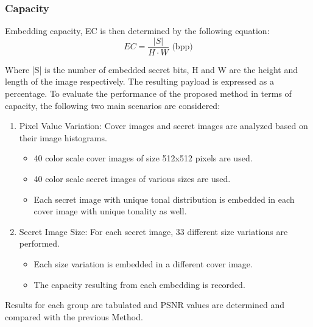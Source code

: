 \documentclass{ittelkom}
\begin{document}
\subsubsection{Capacity}

Embedding capacity, EC is then determined by the following equation:
\begin{equation}
    EC = \frac{|S|}{H \cdot W} \text{ (bpp)}
\end{equation}

Where |S| is the number of embedded secret bits, H and W are the height and
length of the image respectively. The resulting payload is expressed as a
percentage. To evaluate the performance of the proposed method in terms of
capacity, the following two main scenarios are considered:

\begin{enumerate}
    \item Pixel Value Variation: Cover images and secret images are analyzed based on
          their image histograms.
          \begin{itemize}
              \item 40 color scale cover images of size 512x512 pixels are used.
              \item 40 color scale secret images of various sizes are used.
              \item Each secret image with unique tonal distribution is embedded in each cover
                    image with unique tonality as well.
          \end{itemize}
    \item Secret Image Size: For each secret image, 33 different size variations are
          performed.
          \begin{itemize}
              \item Each size variation is embedded in a different cover image.
              \item The capacity resulting from each embedding is recorded.
          \end{itemize}
\end{enumerate}

Results for each group are tabulated and PSNR values are determined and
compared with the previous Method.

\end{document}

